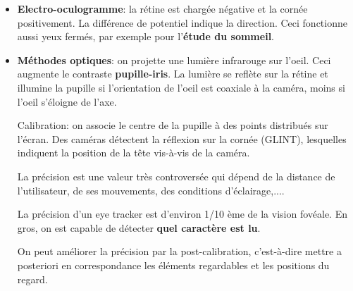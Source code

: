 \begin{itemize}
\item \textbf{Electro-oculogramme}: la r\'etine est charg\'ee n\'egative et la corn\'ee positivement. La diff\'erence de potentiel indique la direction. Ceci fonctionne aussi yeux ferm\'es, par exemple pour l'\textbf{\'etude du sommeil}.

\begin{figure}[H]
\centering
{}
\end{figure}

\item \textbf{M\'ethodes optiques}: on projette une lumière infrarouge sur l'oeil. Ceci augmente le contraste \textbf{pupille-iris}. La lumi\`ere se refl\`ete sur la r\'etine et illumine la pupille si l'orientation de l'oeil est coaxiale \`a la cam\'era, moins si l'oeil s'\'eloigne de l'axe. 

Calibration: on associe le centre de la pupille \`a des points distribu\'es  sur l'\'ecran. Des cam\'eras d\'etectent la r\'eflexion sur la corn\'ee (GLINT), lesquelles indiquent la position de la t\^ete vis-\`a-vis de la cam\'era.

La pr\'ecision est une valeur tr\`es controvers\'ee qui d\'epend de la distance de l'utilisateur, de ses mouvements, des conditions d'\'eclairage,....

La pr\'ecision d'un eye tracker est d'environ 1/10 \`eme de la vision fov\'eale. En gros, on est capable de d\'etecter \textbf{quel caract\`ere est lu}.

On peut am\'eliorer la précision par la post-calibration, c'est-\`a-dire mettre a posteriori en correspondance les \'el\'ements regardables et les positions du regard.
\end{itemize}

